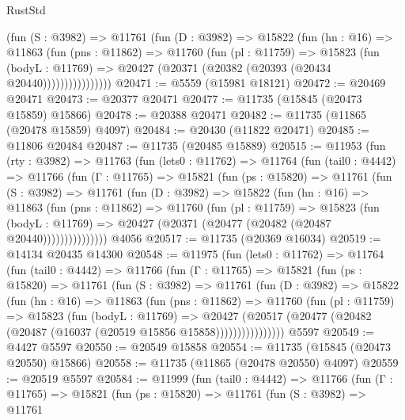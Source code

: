 \begin{lexlean}{RustStd}
\begin{coremodule}
                (fun (S : @3982) =>
                @11761
                  (fun (D : @3982) =>
                  @15822
                    (fun (hn : @16) =>
                    @11863
                      (fun (pns : @11862) =>
                      @11760
                        (fun (pl : @11759) =>
                        @15823
                          (fun (bodyL : @11769) =>
                          @20427 (@20371 (@20382 (@20393 (@20434 @20440))))))))))))))))
@20471 := @5559 (@15981 @18121)
@20472 := @20469 @20471
@20473 := @20377 @20471
@20477 := @11735 (@15845 (@20473 @15859) @15866)
@20478 := @20388 @20471
@20482 := @11735 (@11865 (@20478 @15859) @4097)
@20484 := @20430 (@11822 @20471)
@20485 := @11806 @20484
@20487 := @11735 (@20485 @15889)
@20515 := @11953
    (fun (rty : @3982) =>
    @11763
      (fun (lets0 : @11762) =>
      @11764
        (fun (tail0 : @4442) =>
        @11766
          (fun (Γ : @11765) =>
          @15821
            (fun (ps : @15820) =>
            @11761
              (fun (S : @3982) =>
              @11761
                (fun (D : @3982) =>
                @15822
                  (fun (hn : @16) =>
                  @11863
                    (fun (pns : @11862) =>
                    @11760
                      (fun (pl : @11759) =>
                      @15823
                        (fun (bodyL : @11769) =>
                        @20427 (@20371 (@20477 (@20482 (@20487 @20440)))))))))))))))
    @4056
@20517 := @11735 (@20369 @16034)
@20519 := @14134 @20435 @14300
@20548 := @11975
    (fun (lets0 : @11762) =>
    @11764
      (fun (tail0 : @4442) =>
      @11766
        (fun (Γ : @11765) =>
        @15821
          (fun (ps : @15820) =>
          @11761
            (fun (S : @3982) =>
            @11761
              (fun (D : @3982) =>
              @15822
                (fun (hn : @16) =>
                @11863
                  (fun (pns : @11862) =>
                  @11760
                    (fun (pl : @11759) =>
                    @15823
                      (fun (bodyL : @11769) =>
                      @20427
                        (@20517
                          (@20477 (@20482 (@20487 (@16037 (@20519 @15856 @15858))))))))))))))))
    @5597
@20549 := @4427 @5597
@20550 := @20549 @15858
@20554 := @11735 (@15845 (@20473 @20550) @15866)
@20558 := @11735 (@11865 (@20478 @20550) @4097)
@20559 := @20519 @5597
@20584 := @11999
    (fun (tail0 : @4442) =>
    @11766
      (fun (Γ : @11765) =>
      @15821
        (fun (ps : @15820) =>
        @11761
          (fun (S : @3982) =>
          @11761

\end{coremodule}
\end{lexlean}
